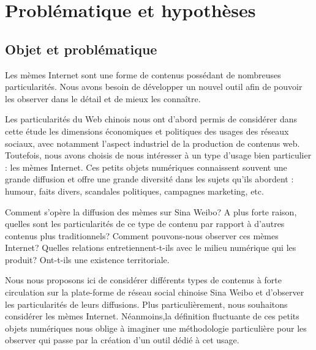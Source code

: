 \chapter*{Problématique et hypothèses}




\section*{Objet et problématique} 

Les mèmes Internet sont une forme de contenus possédant de nombreuses particularités. Nous avons besoin de développer un nouvel outil afin de pouvoir les observer dans le détail et de mieux les connaître.

Les particularités du Web chinois nous ont d{\textquoteright}abord  permis de considérer dans cette étude les dimensions économiques  et politiques des usages des réseaux sociaux, avec notamment  l{\textquoteright}aspect industriel de la production de contenus web.  Toutefois, nous avons choisis de nous intéresser à un type  d{\textquoteright}usage bien particulier : les mèmes Internet. Ces  petits objets numériques connaissent souvent une grande diffusion et  offre une grande diversité dans les sujets qu{\textquoteright}ils  abordent : humour, faits divers, scandales politiques, campagnes  marketing, etc.

Comment s'opère la diffusion des mèmes sur Sina Weibo? A plus forte raison, quelles sont les particularités de ce type de contenu par rapport à d'autres contenus plus traditionnels? Comment pouvons-nous observer ces mèmes Internet? Quelles relations entretiennent-t-ils avec le milieu numérique qui les produit? Ont-t-ils une existence territoriale.

Nous nous proposons ici de considérer différents types de contenus à forte circulation sur la plate-forme de réseau social chinoise Sina Weibo et d'observer les particularités de leurs diffusions. Plus particulièrement, nous souhaitons considérer les mèmes Internet. Néanmoins,la définition fluctuante de ces petits objets numériques nous oblige à imaginer une méthodologie particulière pour les observer qui passe par la création d'un outil dédié à cet usage.


